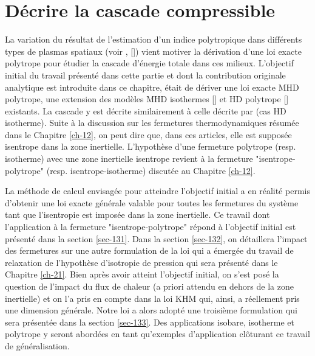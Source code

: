 \chapter{Décrire la cascade compressible}
\renewcommand\partie{\Partie\ Chapitre \thechapter}
\label{ch-13}

\minitoc  

\bigskip

La variation du résultat de l'estimation d'un indice polytropique dans différents types de plasmas spatiaux (voir , [\cite{livadiotis_thermodynamic_2018}]) vient motiver la dérivation d'une loi exacte polytrope pour étudier la cascade d'énergie totale dans ces milieux. L'objectif initial du travail présenté dans cette partie et dont la contribution originale analytique est introduite dans ce chapitre, était de dériver une loi exacte \ac{MHD} polytrope, une extension des modèles \ac{MHD} isothermes [\cite{banerjee_exact_2013,andres_alternative_2017,andres_exact_2018,ferrand_compact_2021}] et \ac{HD} polytrope [\cite{banerjee_kolmogorov-like_2014}] existants. La cascade y est décrite similairement à celle décrite par \cite{galtier_exact_2011} (cas \ac{HD} isotherme). Suite à la discussion sur les fermetures thermodynamiques résumée dans le Chapitre \ref{ch-12}, on peut dire que, dans ces articles, elle est supposée isentrope dans la zone inertielle. L'hypothèse d'une fermeture polytrope (resp. isotherme) avec une zone inertielle isentrope revient à la fermeture "isentrope-polytrope" (resp. isentrope-isotherme) discutée au Chapitre \ref{ch-12}.

La méthode de calcul envisagée pour atteindre l'objectif initial a en réalité permis d'obtenir une loi exacte générale valable pour toutes les fermetures du système tant que l'isentropie est imposée dans la zone inertielle. 
Ce travail dont l'application à la fermeture "isentrope-polytrope" répond à l'objectif initial est présenté dans la section \ref{sec-131}. 
Dans la section \ref{sec-132}, on détaillera l'impact des fermetures sur une autre formulation de la loi qui a émergée du travail de relaxation de l'hypothèse d'isotropie de pression qui sera présenté dans le Chapitre \ref{ch-21}. 
Bien après avoir atteint l'objectif initial, on s'est posé la question de l'impact du flux de chaleur (a priori attendu en dehors de la zone inertielle) et on l'a pris en compte dans la loi \acs{KHM} qui, ainsi, a réellement pris une dimension générale. Notre loi a alors adopté une troisième formulation qui sera présentée dans la section \ref{sec-133}. Des applications isobare, isotherme et polytrope y seront abordées en tant qu'exemples d'application clôturant ce travail de généralisation.

